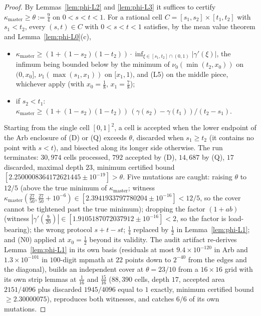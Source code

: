 \documentclass[11pt]{article}
\theoremstyle{plain}
\theoremstyle{definition}
\theoremstyle{remark}
\begin{document}
\begin{proof}
By Lemmas~\ref{lem:phi-L2} and \ref{lem:phi-L3} it suffices to certify
$\kappa_{\mathrm{master}}\ge\theta:=\tfrac94$ on $0<s<t<1$.  For a rational cell
$C=[s_1,s_2]\times[t_1,t_2]$ with $s_1<t_2$, every $(s,t)\in C$ with
$0<s<t<1$ satisfies, by the mean value theorem and
Lemma~\ref{lem:phi-L0}(c),
\begin{itemize}[nosep]
\item[(D)] $\kappa_{\mathrm{master}}\ge(1+(1-s_2)(1-t_2))\cdot\inf_{\xi\in[s_1,t_2]\cap(0,1)}|\gamma'(\xi)|$,
the infimum being bounded below by the minimum of $\nu_0(\min(t_2,x_0))$ on
$(0,x_0]$, $\nu_1(\max(s_1,x_1))$ on $[x_1,1)$, and (L5) on the middle piece,
whichever apply (with $x_0=\tfrac18$, $x_1=\tfrac78$);
\item[(Q)] if $s_2<t_1$: $\kappa_{\mathrm{master}}\ge(1+(1-s_2)(1-t_2))\,(\gamma(s_2)-\gamma(t_1))/(t_2-s_1)$.
\end{itemize}
Starting from the single cell $[0,1]^2$, a cell is accepted when the lower
endpoint of the Arb enclosure of (D) or (Q) exceeds $\theta$, discarded
when $s_1\ge t_2$ (it contains no point with $s<t$), and bisected along its
longer side otherwise.  The run terminates: $30{,}974$ cells processed, $792$
accepted by (D), $14{,}687$ by (Q), $17$ discarded, maximal depth $23$, minimum
certified bound $[2.2500008364172621445\pm10^{-19}]>\theta$.  Five
mutations are caught: raising $\theta$ to $12/5$ (above the true minimum of
$\kappa_{\mathrm{master}}$; witness $\kappa_{\mathrm{master}}(\tfrac{27}{50},\tfrac{27}{50}+10^{-6})\in
[2.3941933797780204\pm10^{-16}]<12/5$, so the cover cannot be
tightened past the true minimum); dropping the factor $(1+ab)$ (witness
$|\gamma'(\tfrac9{20})|\in[1.9105187072037912\pm10^{-16}]<2$, so the
factor is load-bearing); the wrong protocol $s+t-st$; $\tfrac14$ replaced by
$\tfrac12$ in Lemma~\ref{lem:phi-L1}; and (N0) applied at $x_0=\tfrac12$
beyond its validity.  The audit artifact re-derives Lemma~\ref{lem:phi-L1}
in its own basis (residuals at most $9.4\times10^{-120}$ in Arb and
$1.3\times10^{-101}$ in $100$-digit mpmath at $22$ points down to $2^{-40}$
from the edges and the diagonal), builds an independent cover at
$\theta=23/10$ from a $16\times16$ grid with its own strip lemmas at
$\tfrac1{16}$ and $\tfrac{15}{16}$ ($88{,}390$ cells, depth $17$, accepted
area $2151/4096$ plus discarded $1945/4096$ equal to $1$ exactly, minimum
certified bound $\ge2.30000075$), reproduces both witnesses, and catches
$6/6$ of its own mutations.
\end{proof}
\end{document}
